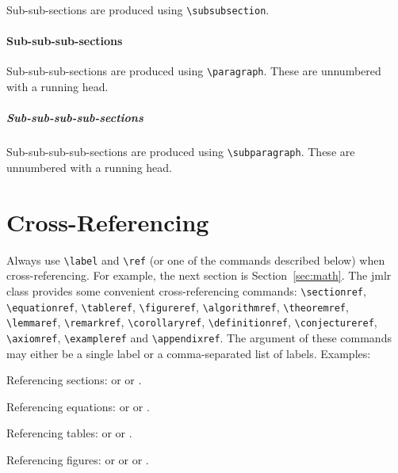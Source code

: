 \documentclass[mlmain]{jmlr}
\begin{document}
Sub-sub-sections are produced using \verb|\subsubsection|.

\paragraph{Sub-sub-sub-sections}

Sub-sub-sub-sections are produced using \verb|\paragraph|.
These are unnumbered with a running head.

\subparagraph{Sub-sub-sub-sub-sections}

Sub-sub-sub-sub-sections are produced using \verb|\subparagraph|.
These are unnumbered with a running head.

\section{Cross-Referencing}

Always use \verb|\label| and \verb|\ref| (or one of the commands
described below) when cross-referencing.  For example, the next
section is Section~\ref{sec:math}. The \textsf{jmlr} class
provides some convenient cross-referencing commands:
\verb|\sectionref|, \verb|\equationref|, \verb|\tableref|,
\verb|\figureref|, \verb|\algorithmref|, \verb|\theoremref|,
\verb|\lemmaref|, \verb|\remarkref|, \verb|\corollaryref|,
\verb|\definitionref|, \verb|\conjectureref|, \verb|\axiomref|,
\verb|\exampleref| and \verb|\appendixref|. The argument of these
commands may either be a single label or a comma-separated list
of labels. Examples:

Referencing sections:  or
 or
.

Referencing equations:  or
 or
.

Referencing tables:  or
 or
.

Referencing figures:  or
 or
 or
.
\end{document}
